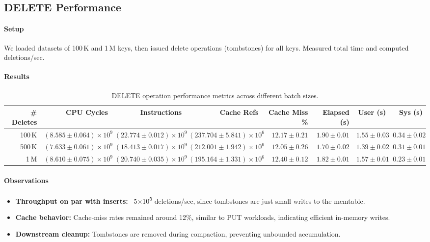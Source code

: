 \documentclass[10pt]{article}
\begin{document}
\subsection{DELETE Performance}

\paragraph{Setup}
We loaded datasets of 100\,K and 1\,M keys, then issued delete operations (tombstones) for all keys. Measured total time and computed deletions/sec.

\paragraph{Results}
\begin{table}[htbp]
  \centering
  \small
  \begin{tabular}{r r r r r r r r}
    \toprule
    \# Deletes  & CPU Cycles                         & Instructions                          & Cache Refs                        & Cache Miss \% & Elapsed (s)     & User (s)        & Sys (s)         \\
    \midrule
    100\,K      & $(8.585\pm0.064)\times10^{9}$      & $(22.774\pm0.012)\times10^{9}$        & $(237.704\pm5.841)\times10^{6}$   & $12.17\pm0.21$ & $1.90\pm0.01$   & $1.55\pm0.03$   & $0.34\pm0.02$   \\
    500\,K      & $(7.633\pm0.061)\times10^{9}$      & $(18.413\pm0.017)\times10^{9}$        & $(212.001\pm1.942)\times10^{6}$   & $12.05\pm0.26$ & $1.70\pm0.02$   & $1.39\pm0.02$   & $0.31\pm0.01$   \\
    1\,M        & $(8.610\pm0.075)\times10^{9}$      & $(20.740\pm0.035)\times10^{9}$        & $(195.164\pm1.331)\times10^{6}$   & $12.40\pm0.12$ & $1.82\pm0.01$   & $1.57\pm0.01$   & $0.23\pm0.01$   \\
    \bottomrule
  \end{tabular}
  \caption{DELETE operation performance metrics across different batch sizes.}
  \label{tab:delete_perf_full}
\end{table}


\paragraph{Observations}
\begin{itemize}[itemsep=0.5ex]
  \item \textbf{Throughput on par with inserts:} ~5×10\textsuperscript{5} deletions/sec, since tombstones are just small writes to the memtable.
  \item \textbf{Cache behavior:} Cache‐miss rates remained around 12\%, similar to PUT workloads, indicating efficient in‐memory writes.
  \item \textbf{Downstream cleanup:} Tombstones are removed during compaction, preventing unbounded accumulation.
\end{itemize}
\end{document}
